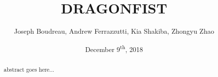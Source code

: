 \documentclass[11pt,twocolumn]{IEEEtran}
\title{DRAGONFIST}
\author{Joseph Boudreau, Andrew Ferrazzutti, Kia Shakiba, Zhongyu Zhao}
\date{December 9\textsuperscript{th}, 2018}
\begin{document}
	\maketitle

	\begin{abstract}
		abstract goes here...
	\end{abstract}

	

	
	{}
\end{document}
